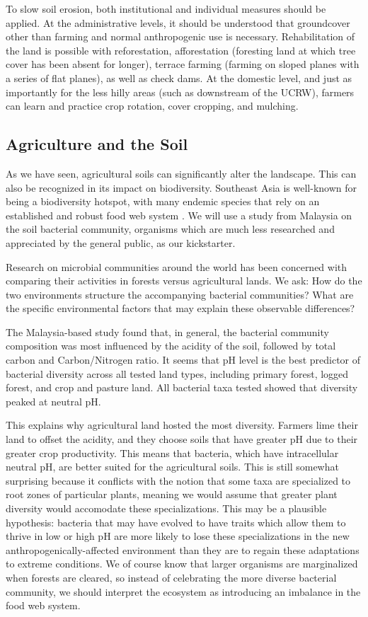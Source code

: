 To slow soil erosion, both institutional and individual measures should be applied. At the administrative levels, it should be understood that groundcover other than farming and normal anthropogenic use is necessary. Rehabilitation of the land is possible with reforestation, afforestation (foresting land at which tree cover has been absent for longer), terrace farming (farming on sloped planes with a series of flat planes), as well as check dams. At the domestic level, and just as importantly for the less hilly areas (such as downstream of the UCRW), farmers can learn and practice crop rotation, cover cropping, and mulching.

\subsection{Agriculture and the Soil}


As we have seen, agricultural soils can significantly alter the landscape. This can also be recognized in its impact on biodiversity. Southeast Asia is well-known for being a biodiversity hotspot, with many endemic species that rely on an established and robust food web system \citep{tripathi2012tropical}. We will use a study from Malaysia on the soil bacterial community, organisms which are much less researched and appreciated by the general public, as our kickstarter. 

Research on microbial communities around the world has been concerned with comparing their activities in forests versus agricultural lands. We ask: How do the two environments structure the accompanying bacterial communities?  What are the specific environmental factors that may explain these observable differences?

The Malaysia-based study found that, in general, the bacterial community composition was most influenced by the acidity of the soil, followed by total carbon and Carbon/Nitrogen ratio. It seems that pH level is the best predictor of bacterial diversity across all tested land types, including primary forest, logged forest, and crop and pasture land. All bacterial taxa tested showed that diversity peaked at neutral pH. 

This explains why agricultural land hosted the most diversity. Farmers lime their land to offset the acidity, and they choose soils that have greater pH due to their greater crop productivity. This means that bacteria, which have intracellular neutral pH, are better suited for the agricultural soils. This is still somewhat surprising because it conflicts with the notion that some taxa are specialized to root zones of particular plants, meaning we would assume that greater plant diversity would accomodate these specializations. This may be a plausible hypothesis: bacteria that may have evolved to have traits which allow them to thrive in low or high pH are more likely to lose these specializations in the new anthropogenically-affected environment than they are to regain these adaptations to extreme conditions. We of course know that larger organisms are marginalized when forests are cleared, so instead of celebrating the more diverse bacterial community, we should interpret the ecosystem as introducing an imbalance in the food web system. 

